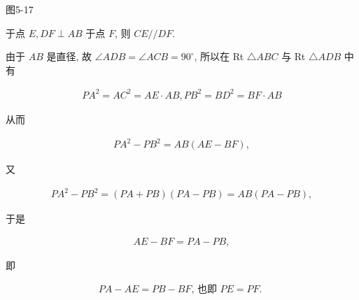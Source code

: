 \documentclass[10pt]{article}
\begin{document}
图5-17

于点 $E, D F \perp A B$ 于点 $F$, 则 $C E / / D F$.

由于 $A B$ 是直径, 故 $\angle A D B=\angle A C B=90^{\circ}$, 所以在 Rt $\triangle A B C$ 与 Rt $\triangle A D B$ 中有

\begin{align*}
P A^{2}=A C^{2}=A E \cdot A B, P B^{2}=B D^{2}=B F \cdot A B
\end{align*}

从而

\begin{align*}
P A^{2}-P B^{2}=A B(A E-B F),
\end{align*}

又

\begin{align*}
P A^{2}-P B^{2}=(P A+P B)(P A-P B)=A B(P A-P B),
\end{align*}

于是

\begin{align*}
A E-B F=P A-P B,
\end{align*}

即

\begin{align*}
P A-A E=P B-B F \text {, 也即 } P E=P F \text {. }
\end{align*}
\end{document}
